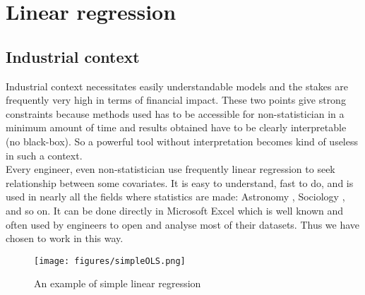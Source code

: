\documentclass[12pt,a4paper]{report}
\begin{document}
	
	\section{Linear regression}
%			
		\subsection{Industrial context}
		
			Industrial context necessitates easily understandable models and the stakes are frequently very high in terms of financial impact. 
		These two points give strong constraints because methods used has to be accessible for non-statistician in a minimum amount of time and results obtained have to be clearly interpretable (no black-box). So a powerful tool without interpretation becomes kind of useless in such a context.\\
		
		Every engineer, even non-statistician use frequently linear regression to seek relationship between some covariates. It is easy to understand, fast to do, and is used in nearly all the fields where statistics are made\cite{montgomery2012introduction}: Astronomy \cite{isobe1990linear}, Sociology \cite{longford2012revision}, and so on. It can be done directly in Microsoft Excel which is well known and often used by engineers to open and analyse most of their datasets. Thus we have chosen to work in this way.\\
		 
\begin{figure}
\centering
	\texttt{[image: figures/simpleOLS.png]} 
	\caption{An example of simple linear regression}
\end{figure}		 
		 
\end{document}
